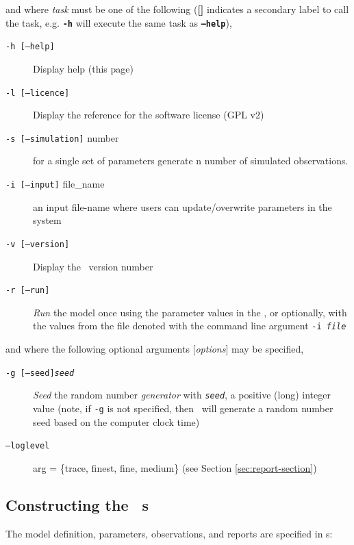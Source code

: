 and where \emph{task} must be one of the following (\textbf{[]} indicates a secondary label to call the task, e.g. \textbf{\texttt{-h}} will execute the same task as \textbf{\texttt{--help}}),

\begin{description}
\item [\texttt{-h [--help]}] Display help (this page)
\item [\texttt{-l [--licence]}] Display the reference for the software license (GPL v2)
\item [\texttt{-s [--simulation]} number] for a single set of parameters generate n number of simulated observations.
\item [\texttt{-i [--input]} file\_name] an input file-name where users can update/overwrite parameters in the system
\item [\texttt{-v [--version]}] Display the \IBM\ version number

\item [\texttt{-r [--run]}] \emph{Run} the model once using the parameter values in the \config, or optionally, with the values from the file denoted with the command line argument \texttt{-i \emph{file}}

\end{description}

and where the following optional arguments [\emph{options}] may be specified,

\begin{description}
\item [\texttt{-g [--seed]\emph{seed}}]  \emph{Seed} the random number \emph{generator} with \texttt{\emph{seed}}, a positive (long) integer value (note, if \texttt{-g} is not specified, then \IBM\ will  generate a random number seed based on the computer clock time)

\item [\texttt{--loglevel}] arg = \{trace, finest, fine, medium\} (see Section \ref{sec:report-section})
\end{description}

\subsection{Constructing the \IBM\ \config s \label{constructing-config}}

The model definition, parameters, observations, and reports are specified in \config s:
 
